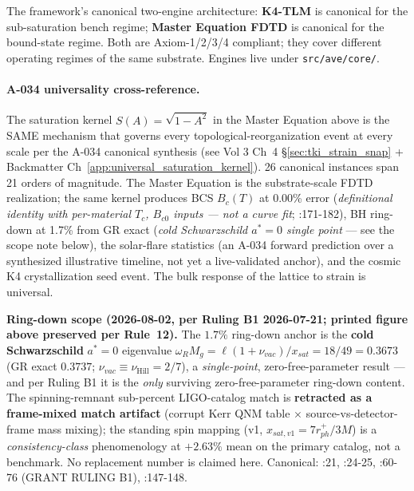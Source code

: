 The framework's canonical two-engine architecture:
\textbf{K4-TLM} is canonical for the sub-saturation bench regime;
\textbf{Master Equation FDTD} is canonical for the bound-state regime.
Both are Axiom-1/2/3/4 compliant; they cover different operating regimes
of the same substrate. Engines live under \texttt{src/ave/core/}.

\paragraph{A-034 universality cross-reference.} The saturation kernel
$S(A) = \sqrt{1 - A^2}$ in the Master Equation above is the SAME mechanism
that governs every topological-reorganization event at every scale per the
A-034 canonical synthesis (see Vol 3 Ch~4 \S\ref{sec:tki_strain_snap}
+ Backmatter Ch~\ref{app:universal_saturation_kernel}). 26 canonical
instances span 21 orders of magnitude. The Master Equation is the
substrate-scale FDTD realization; the same kernel produces BCS
$B_c(T)$ at 0.00\% error (\emph{definitional identity with per-material
$T_c$, $B_{c0}$ inputs --- not a curve fit}; :171-182),
BH ring-down at 1.7\% from GR exact
(\emph{cold Schwarzschild $a^* = 0$ single point} --- see the scope note
below), the
solar-flare statistics (an A-034 forward prediction over a synthesized
illustrative timeline, not yet a live-validated anchor),
and the cosmic K4 crystallization
seed event. The bulk response of the lattice to strain is universal.

\noindent\textbf{Ring-down scope (2026-08-02, per Ruling B1 2026-07-21; printed figure above preserved per Rule~12).} The $1.7\%$ ring-down anchor is the \textbf{cold Schwarzschild} $a^{*} = 0$ eigenvalue $\omega_R M_g = \ell(1+\nu_{vac})/x_{sat} = 18/49 = 0.3673$ (GR exact $0.3737$; $\nu_{vac} \equiv \nu_\text{Hill} = 2/7$), a \emph{single-point}, zero-free-parameter result --- and per Ruling B1 it is the \emph{only} surviving zero-free-parameter ring-down content. The spinning-remnant sub-percent LIGO-catalog match is \textbf{retracted as a frame-mixed match artifact} (corrupt Kerr QNM table $\times$ source-vs-detector-frame mass mixing); the standing spin mapping (v1, $x_{sat,v1} = 7r_{ph}^{+}/3M$) is a \emph{consistency-class} phenomenology at $+2.63\%$ mean on the primary catalog, not a benchmark. No replacement number is claimed here. Canonical: :21, :24-25, :60-76 (GRANT RULING B1), :147-148.

